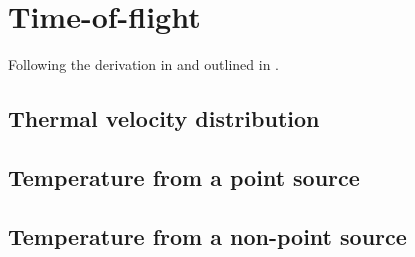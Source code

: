 \section{Time-of-flight}

Following the derivation in \cite{Yavin_AJP_2002} and outlined in \cite{Ding_MS_2017}.

\subsection{Thermal velocity distribution}

\subsection{Temperature from a point source}

\subsection{Temperature from a non-point source}